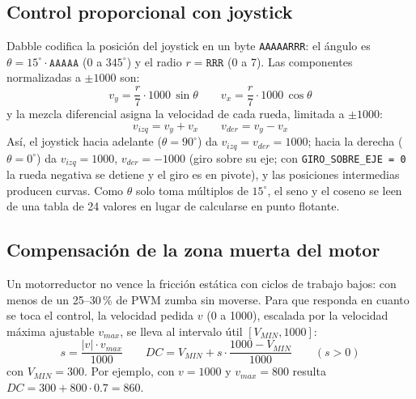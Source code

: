 \subsection{Control proporcional con joystick}
\label{sec:mezcla}

Dabble codifica la posición del joystick en un byte \texttt{AAAAARRR}: el
ángulo es $\theta = 15^\circ \cdot \texttt{AAAAA}$ (0 a $345^\circ$) y el radio
$r = \texttt{RRR}$ (0 a 7). Las componentes normalizadas a $\pm 1000$ son:
\begin{equation}
  v_y = \frac{r}{7}\cdot 1000\,\sin\theta
  \qquad
  v_x = \frac{r}{7}\cdot 1000\,\cos\theta
\end{equation}
y la mezcla diferencial asigna la velocidad de cada rueda, limitada a $\pm 1000$:
\begin{equation}
  v_{izq} = v_y + v_x \qquad v_{der} = v_y - v_x
\end{equation}
Así, el joystick hacia adelante ($\theta = 90^\circ$) da $v_{izq} = v_{der} =
1000$; hacia la derecha ($\theta = 0^\circ$) da $v_{izq} = 1000$, $v_{der} =
-1000$ (giro sobre su eje; con \texttt{GIRO\_SOBRE\_EJE = 0} la rueda negativa
se detiene y el giro es en pivote), y las posiciones intermedias producen
curvas. Como
$\theta$ solo toma múltiplos de $15^\circ$, el seno y el coseno se leen de una
tabla de 24 valores en lugar de calcularse en punto flotante.

\subsection{Compensación de la zona muerta del motor}

Un motorreductor no vence la fricción estática con ciclos de trabajo bajos:
con menos de un 25--30\,\% de PWM zumba sin moverse. Para que responda en cuanto
se toca el control, la velocidad pedida $v$ (0 a 1000), escalada por la
velocidad máxima ajustable $v_{max}$, se lleva al intervalo útil
$[V_{MIN}, 1000]$:
\begin{equation}
  s = \frac{|v|\cdot v_{max}}{1000}
  \qquad
  DC = V_{MIN} + s\cdot\frac{1000 - V_{MIN}}{1000}
  \qquad (s > 0)
\end{equation}
con $V_{MIN} = 300$. Por ejemplo, con $v = 1000$ y $v_{max} = 800$ resulta
$DC = 300 + 800\cdot 0.7 = 860$.
